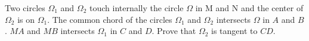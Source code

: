 Two circles $\Omega_{1}$ and $\Omega_{2}$ touch internally the circle $\Omega$ in M and N and the center of $\Omega_{2}$ is on $\Omega_{1}$. The common chord of the circles $\Omega_{1}$ and $\Omega_{2}$ intersects $\Omega$ in $A$ and $B$. $MA$ and $MB$ intersects $\Omega_{1}$ in $C$ and $D$. Prove that $\Omega_{2}$ is tangent to $CD$.